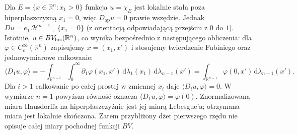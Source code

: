 \begin{przyklad}
Dla $E=\{x\in\mathbb R^n:x_1>0\}$ funkcja
$u=\chi_E$ jest lokalnie stała poza hiperpłaszczyzną
$x_1=0$, więc $D_{\mathrm{ap}}u=0$ prawie wszędzie.
Jednak $Du=e_1\,\mathcal H^{n-1}\llcorner\{x_1=0\}$
(z orientacją odpowiadającą przejściu z $0$ do $1$).
Istotnie, $u\in BV_{\rm loc}(\mathbb R^n)$,
co wynika bezpośrednio z następującego obliczenia:
dla $\varphi\in C_c^\infty(\mathbb R^n)$ zapisujemy
$x=(x_1,x')$ i stosujemy twierdzenie Fubiniego
oraz jednowymiarowe całkowanie:
\[
 \langle D_1u,\varphi\rangle
 =-\int_{\mathbb R^{n-1}}\int_0^\infty
 \partial_1\varphi(x_1,x')\,\mathrm d\lambda_1(x_1)
 \,\mathrm d\lambda_{n-1}(x')
 =\int_{\mathbb R^{n-1}}\varphi(0,x')\,\mathrm d\lambda_{n-1}(x').
\]
Dla $i>1$ całkowanie po całej prostej w zmiennej
$x_i$ daje $\langle D_i u,\varphi\rangle=0$.
W wymiarze $n=1$ powyższa równość oznacza
$\langle D_1u,\varphi\rangle=\varphi(0)$.
Znormalizowana miara Hausdorffa na hiperpłaszczyźnie
jest jej miarą Lebesgue'a; otrzymana miara jest
lokalnie skończona. Zatem przybliżony dżet pierwszego rzędu nie opisuje
całej miary pochodnej funkcji $BV$.
\end{przyklad}

